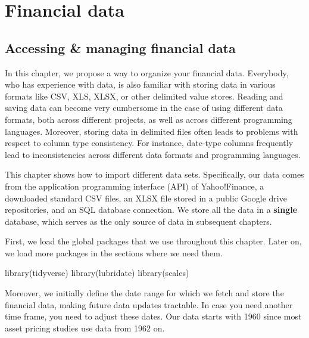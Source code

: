 \documentclass[
]{book}
\newenvironment{Shaded}{\begin{snugshade}}{\end{snugshade}}
\newcommand{\FunctionTok}[1]{\textcolor[rgb]{0,0,0}{#1}}
\newcommand{\NormalTok}[1]{#1}
\begin{document}
\hypertarget{part-financial-data}{%
\part*{Financial data}\label{part-financial-data}}


\hypertarget{accessing-managing-financial-data}{%
\chapter{Accessing \& managing financial data}\label{accessing-managing-financial-data}}

In this chapter, we propose a way to organize your financial data. Everybody, who has experience with data, is also familiar with storing data in various formats like CSV, XLS, XLSX, or other delimited value stores. Reading and saving data can become very cumbersome in the case of using different data formats, both across different projects, as well as across different programming languages. Moreover, storing data in delimited files often leads to problems with respect to column type consistency. For instance, date-type columns frequently lead to inconsistencies across different data formats and programming languages.

This chapter shows how to import different data sets. Specifically, our data comes from the application programming interface (API) of Yahoo!Finance, a downloaded standard CSV files, an XLSX file stored in a public Google drive repositories, and an SQL database connection. We store all the data in a \textbf{single} database, which serves as the only source of data in subsequent chapters.

First, we load the global packages that we use throughout this chapter. Later on, we load more packages in the sections where we need them.

\begin{Shaded}
\begin{Highlighting}[]
\FunctionTok{library}\NormalTok{(tidyverse)}
\FunctionTok{library}\NormalTok{(lubridate)}
\FunctionTok{library}\NormalTok{(scales)}
\end{Highlighting}
\end{Shaded}

Moreover, we initially define the date range for which we fetch and store the financial data, making future data updates tractable. In case you need another time frame, you need to adjust these dates. Our data starts with 1960 since most asset pricing studies use data from 1962 on.
\end{document}
